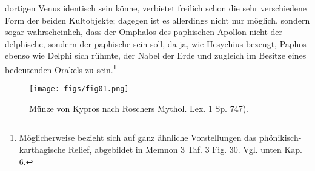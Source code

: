 \documentclass[a4paper, 11pt, oneside]{article}
\begin{document}
dortigen Venus identisch sein könne, verbietet freilich schon die sehr verschiedene Form der beiden Kultobjekte; dagegen ist es allerdings nicht nur möglich, sondern sogar wahrscheinlich, dass der Omphalos des paphischen Apollon nicht der delphische, sondern der paphische sein soll, da ja, wie Hesychius bezeugt, Paphos ebenso wie Delphi sich rühmte, der Nabel der Erde und zugleich im Besitze eines bedeutenden Orakels zu sein.\footnote{Möglicherweise bezieht sich auf ganz ähnliche Vorstellungen das phönikisch-karthagische Relief, abgebildet in Memnon 3 Taf. 3 Fig. 30. Vgl. unten Kap. 6.}

\begin{figure}[H]
\centering
\texttt{[image: figs/fig01.png]}
\caption*{Münze von Kypros nach Roschers Mythol. Lex. 1 Sp. 747).}
\end{figure}
\end{document}
